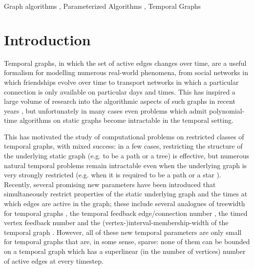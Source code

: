 \documentclass[preprint,12pt]{elsarticle}
\begin{document}
\begin{frontmatter}
\begin{keyword}
Graph algorithms \sep 
Parameterized Algorithms \sep
Temporal Graphs



\end{keyword}

\end{frontmatter}



\section{Introduction}

Temporal graphs, in which the set of active edges changes over time, are a useful formalism for modelling numerous real-world phenomena, from social networks in which friendships evolve over time to transport networks in which a particular connection is only available on particular days and times.  This has inspired a large volume of research into the algorithmic aspects of such graphs in recent years \cite{casteigts_temporal_2021,holme_temporal_2012,michail_introduction_2016}, but unfortunately in many cases even problems which admit polynomial-time algorithms on static graphs become intractable in the temporal setting.  

This has motivated the study of computational problems on restricted classes of temporal graphs, with mixed success: in a few cases, restricting the structure of the underlying static graph (e.g. to be a path or a tree) is effective, but numerous natural temporal problems remain intractable even when the underlying graph is very strongly restricted (e.g. when it is required to be a path \cite{mertzios_computing_2023} or a star \cite{akrida_temporal_2021}).  Recently, several promising new parameters have been introduced that simultaneously restrict properties of the static underlying graph and the times at which edges are active in the graph; these include several analogues of treewidth for temporal graphs \cite{fluschnik_as_2020,mans_treewidth_2014}, the temporal feedback edge/connection number \cite{haag_feedback_2022}, the timed vertex feedback number \cite{casteigts_finding_2021} and the (vertex-)interval-membership-width of the temporal graph \cite{bumpus_edge_2023}.  
However, all of these new temporal parameters are only small for temporal graphs that are, in some sense, sparse: none of them can be bounded on a temporal graph which has a superlinear (in the number of vertices) number of active edges at every timestep.  
\end{document}
